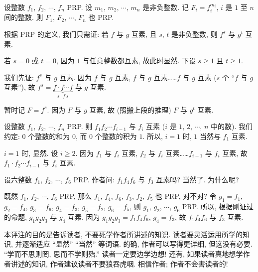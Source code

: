 \begin{proposition}
    设整数 $f_1$, $f_2$, $\cdots$, $f_n$ PRP. 设 $m_1$, $m_2$, $\cdots$, $m_n$ 是非负整数. 记 $F_i = f_i^{m_i}$, $i$ 是 $1$ 至 $n$ 间的整数. 则 $F_1$, $F_2$, $\cdots$, $F_n$ 也 PRP.
\end{proposition}

\begin{pf}
    根据 PRP 的定义, 我们只需证: 若 $f$ 与 $g$ 互素, 且 $s$, $t$ 是非负整数, 则 $f^s$ 与 $g^t$ 互素.

    若 $s = 0$ 或 $t = 0$, 因为 $1$ 与任意整数都互素, 故此时显然. 下设 $s \geq 1$ 且 $t \geq 1$.

    我们先证: $f^s$ 与 $g$ 互素. 因为 $f$ 与 $g$ 互素, $f$ 与 $g$ 互素……$f$ 与 $g$ 互素 ($s$ 个 ``$f$ 与 $g$ 互素''), 故 $f^s = \underbrace{f \cdot f \cdots f}_{\text{$s$ $f$'s}}$ 与 $g$ 互素.

    暂时记 $F = f^s$. 因为 $F$ 与 $g$ 互素, 故 (照搬上段的推理) $F$ 与 $g^t$ 互素.
\end{pf}

\begin{proposition}
    设整数 $f_1$, $f_2$, $\cdots$, $f_n$ PRP. 则 $f_1 f_2 \cdots f_{i-1}$ 与 $f_i$ 互素 ($i$ 是 $1$, $2$, $\cdots$, $n$ 中的数). 我们约定: $0$ 个整数的和为 $0$, 而 $0$ 个整数的积为 $1$. 所以, $i = 1$ 时, $1$ 当然与 $f_1$ 互素.
\end{proposition}

\begin{pf}
    $i = 1$ 时, 显然. 设 $i \geq 2$. 因为 $f_1$ 与 $f_i$ 互素, $f_2$ 与 $f_i$ 互素……$f_{i-1}$ 与 $f_i$ 互素, 故 $f_1 \cdot f_2 \cdots f_{i-1}$ 与 $f_i$ 互素.
\end{pf}

\begin{remark}
    设六整数 $f_1$, $f_2$, $\cdots$, $f_6$ PRP. 作者问: $f_1 f_4 f_6$ 与 $f_3$ 互素吗? 当然了. 为什么呢?

    既然 $f_1$, $f_2$, $\cdots$, $f_6$ PRP, 那么 $f_1$, $f_4$, $f_6$, $f_3$, $f_2$, $f_5$ 也 PRP, 对不对? 令 $g_1 = f_1$, $g_2 = f_4$, $g_3 = f_6$, $g_4 = f_3$, $g_5 = f_2$, $g_6 = f_5$, 则 $g_1$, $g_2$, $\cdots$, $g_6$ PRP. 所以, 根据刚证过的命题, $g_1 g_2 g_3$ 与 $g_4$ 互素. 因为 $g_1 g_2 g_3 = f_1 f_4 f_6$, $g_4 = f_3$, 故 $f_1 f_4 f_6$ 与 $f_3$ 互素.

    本评注的目的是告诉读者, 不要死学作者所讲述的知识. 读者要灵活运用所学的知识, 并逐渐适应 ``显然'' ``当然'' 等词语. 的确, 作者可以写得更详细, 但这没有必要. ``学而不思则罔, 思而不学则殆.'' 读者一定要边学边想! 还有, 如果读者真地想学作者讲述的知识, 作者建议读者不要狼吞虎咽. 相信作者; 作者不会害读者的!
\end{remark}

